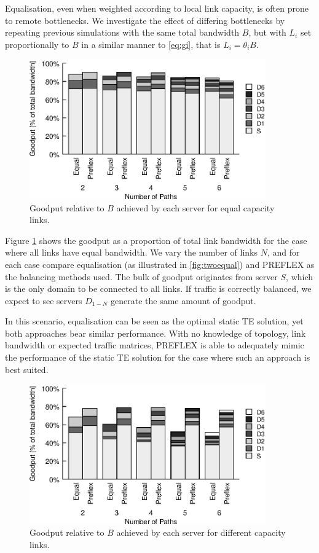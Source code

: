 Equalisation, even when weighted according to local link capacity, is often prone to remote bottlenecks. 
We investigate the effect of differing bottlenecks by repeating previous simulations with the same total bandwidth $B$, but with $L_i$ set proportionally to $B$ in a similar manner to \eqref{eq:gi}, that is $L_i = \theta_i B$.


\begin{figure}
    \centering
    \includegraphics[width=4in]{figures/cate/eqbw}
    \caption{Goodput relative to $B$ achieved by each server for equal capacity links.}
    \label{fig:goodputeq}
\end{figure}

Figure \ref{fig:goodputeq} shows the goodput as a proportion of total link bandwidth for the case where all links have equal bandwidth. 
We vary the number of links $N$, and for each case compare equalisation (as illustrated in \ref{fig:twoequal}) and \ac{PREFLEX} as the balancing methods used. 
The bulk of goodput originates from server $S$, which is the only domain to be connected to all links.  
If traffic is correctly balanced, we expect to see servers $D_{1-N}$ generate the same amount of goodput.

In this scenario, equalisation can be seen as the optimal static TE solution, yet both approaches bear similar performance. 
With no knowledge of topology, link bandwidth or expected traffic matrices, \ac{PREFLEX} is able to adequately mimic the performance of the static TE solution for the case where such an approach is best suited.


\begin{figure}
    \centering
    \includegraphics[width=4in]{figures/cate/diffbw}
    \caption{Goodput relative to $B$ achieved by each server for different capacity links.}
    \label{fig:goodputdiff}
\end{figure}

